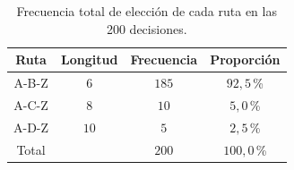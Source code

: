\begin{table}[H]
\centering
\small
\setlength{\tabcolsep}{6pt}
\renewcommand{\arraystretch}{1.15}
\begin{tabular}{|c|c|c|c|}
\hline
\rowcolor{encabezado}\textbf{Ruta} & \textbf{Longitud} & \textbf{Frecuencia} & \textbf{Proporción} \\
\hline
A-B-Z & $6$ & $185$ & $92{,}5$\,\% \\
\hline
A-C-Z & $8$ & $10$ & $5{,}0$\,\% \\
\hline
A-D-Z & $10$ & $5$ & $2{,}5$\,\% \\
\hline
Total &  & $200$ & $100{,}0$\,\% \\
\hline
\end{tabular}
\caption{Frecuencia total de elección de cada ruta en las 200 decisiones.}
\label{tab:p4b-frecuencias}
\end{table}

